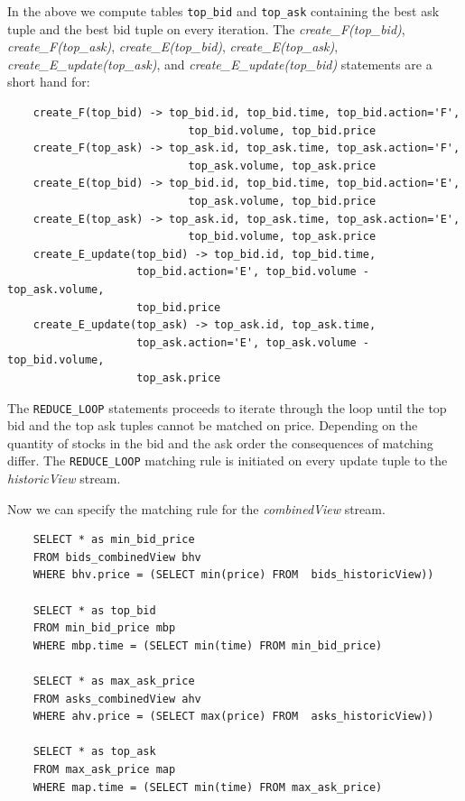 \documentclass{article}
\begin{document}
In the above we compute tables {\tt top\_bid} and {\tt top\_ask} containing the best ask tuple and the best bid tuple on every iteration. The \emph{create\_F(top\_bid)}, \emph{create\_F(top\_ask)}, \emph{create\_E(top\_bid)}, \emph{create\_E(top\_ask)}, \emph{create\_E\_update(top\_ask)}, and \emph{create\_E\_update(top\_bid)} statements are a short hand for:

\begin{verbatim}
    create_F(top_bid) -> top_bid.id, top_bid.time, top_bid.action='F',
                            top_bid.volume, top_bid.price
    create_F(top_ask) -> top_ask.id, top_ask.time, top_ask.action='F',
                            top_ask.volume, top_ask.price
    create_E(top_bid) -> top_bid.id, top_bid.time, top_bid.action='E',
                            top_ask.volume, top_bid.price
    create_E(top_ask) -> top_ask.id, top_ask.time, top_ask.action='E',
                            top_bid.volume, top_ask.price
    create_E_update(top_bid) -> top_bid.id, top_bid.time,
                    top_bid.action='E', top_bid.volume - top_ask.volume,
                    top_bid.price
    create_E_update(top_ask) -> top_ask.id, top_ask.time,
                    top_ask.action='E', top_ask.volume - top_bid.volume,
                    top_ask.price
\end{verbatim}


The {\tt REDUCE\_LOOP} statements proceeds to iterate through the loop until the top bid and the top ask tuples cannot be matched on price. Depending on the quantity of stocks in the bid and the ask order the consequences of matching differ. The {\tt REDUCE\_LOOP} matching rule is initiated on every update tuple to the \emph{historicView} stream. 

Now we can specify the matching rule for the \emph{combinedView} stream.

\begin{verbatim}      
    SELECT * as min_bid_price
    FROM bids_combinedView bhv
    WHERE bhv.price = (SELECT min(price) FROM  bids_historicView))
    
    SELECT * as top_bid
    FROM min_bid_price mbp
    WHERE mbp.time = (SELECT min(time) FROM min_bid_price)
    
    SELECT * as max_ask_price
    FROM asks_combinedView ahv
    WHERE ahv.price = (SELECT max(price) FROM  asks_historicView))
    
    SELECT * as top_ask
    FROM max_ask_price map
    WHERE map.time = (SELECT min(time) FROM max_ask_price)
\end{verbatim}
\end{document}
